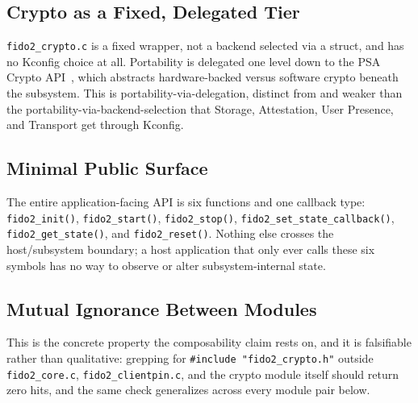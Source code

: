\subsection{Crypto as a Fixed, Delegated Tier}
\label{subsec:arch-crypto}

\texttt{fido2\_crypto.c} is a fixed wrapper, not a backend selected via a struct, and has no Kconfig choice at all. Portability is delegated one level down to the PSA Crypto API~\cite{psa-crypto-api}, which abstracts hardware-backed versus software crypto beneath the subsystem. This is portability-via-delegation, distinct from and weaker than the portability-via-backend-selection that Storage, Attestation, User Presence, and Transport get through Kconfig.

\subsection{Minimal Public Surface}
\label{subsec:arch-surface}

The entire application-facing API is six functions and one callback type: \texttt{fido2\_init()}, \texttt{fido2\_start()}, \texttt{fido2\_stop()}, \texttt{fido2\_set\_state\_callback()}, \texttt{fido2\_get\_state()}, and \texttt{fido2\_reset()}. Nothing else crosses the host/subsystem boundary; a host application that only ever calls these six symbols has no way to observe or alter subsystem-internal state.

\subsection{Mutual Ignorance Between Modules}
\label{subsec:arch-ignorance}

This is the concrete property the composability claim rests on, and it is falsifiable rather than qualitative: grepping for \texttt{\#include "fido2\_crypto.h"} outside \texttt{fido2\_core.c}, \texttt{fido2\_clientpin.c}, and the crypto module itself should return zero hits, and the same check generalizes across every module pair below.

